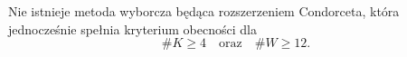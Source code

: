 \documentclass[12pt,a4paper]{mwrep}
\begin{document}
	\begin{theorem}
		Nie istnieje metoda wyborcza będąca rozszerzeniem Condorceta, która jednocześnie spełnia kryterium obecności dla
		\[
		\#K \geq 4
		\quad \text{oraz} \quad
		\#W \geq 12.
		\]
	\end{theorem}

\end{document}
